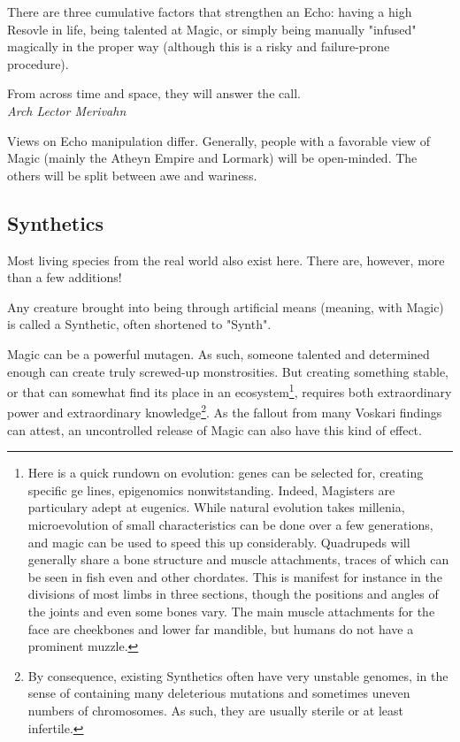 There are three cumulative factors that strengthen an Echo: having a high Resovle in life, being talented at Magic, or simply being manually "infused" magically in the proper way (although this is a risky and failure-prone procedure).

\begin{rpg-quotebox}
    From across time and space, they will answer the call. \\ \textendash \textit{Arch Lector Merivahn}
\end{rpg-quotebox}
        
Views on Echo manipulation differ. Generally, people with a favorable view of Magic (mainly the Atheyn Empire and Lormark) will be open-minded. The others will be split between awe and wariness.




\subsection{Synthetics}

Most living species from the real world also exist here. There are, however, more than a few additions!


Any creature brought into being through artificial means (meaning, with Magic) is called a Synthetic, often shortened to "Synth".

Magic can be a powerful mutagen. As such, someone talented and determined enough can create truly screwed-up monstrosities. But creating something stable, or that can somewhat find its place in an ecosystem\footnote{Here is a quick rundown on evolution: genes can be selected for, creating specific ge lines, epigenomics nonwitstanding. Indeed, Magisters are particulary adept at eugenics. While natural evolution takes millenia, microevolution of small characteristics can be done over a few generations, and magic can be used to speed this up considerably. Quadrupeds will generally share a bone structure and muscle attachments, traces of which can be seen in fish even and other chordates. This is manifest for instance in the divisions of most limbs in three sections, though the positions and angles of the joints and even some bones vary. The main muscle attachments for the face are cheekbones and lower far mandible, but humans do not have a prominent muzzle.}, requires both extraordinary power and extraordinary knowledge\footnote{By consequence, existing Synthetics often have very unstable genomes, in the sense of containing many deleterious mutations and sometimes uneven numbers of chromosomes. As such, they are usually sterile or at least infertile.}. As the fallout from many Voskari findings can attest, an uncontrolled release of Magic can also have this kind of effect.

